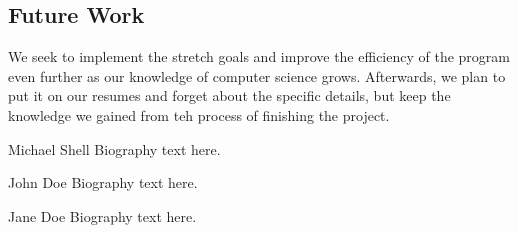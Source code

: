 \documentclass[10pt,conference,onecolumn,compsoc]{IEEEtran}
\begin{document}
\subsection{Future Work}
We seek to implement the stretch goals and improve the efficiency of the program even further as our knowledge of computer science grows. Afterwards, we plan to put it on our resumes and forget about the specific details, but keep the knowledge we gained from teh process of finishing the project.





\begin{IEEEbiography}{Michael Shell}
Biography text here.
\end{IEEEbiography}

\begin{IEEEbiographynophoto}{John Doe}
Biography text here.
\end{IEEEbiographynophoto}


\begin{IEEEbiographynophoto}{Jane Doe}
Biography text here.
\end{IEEEbiographynophoto}





\end{document}

